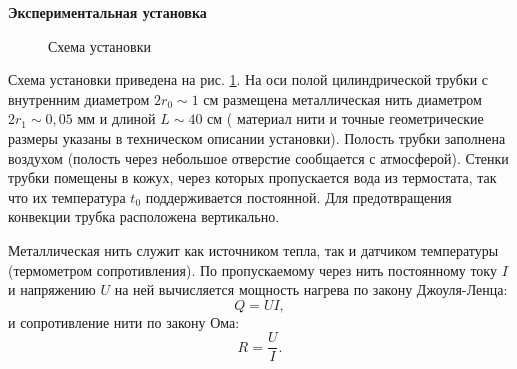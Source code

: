 \documentclass[a4paper, 12pt]{article}
\begin{document}
    \begin{center}
        {\Large {\bf Экспериментальная установка}}
    \end{center}
    
    \begin{figure}
        \caption{Схема установки}
        \label{pic2}
    \end{figure}
    Схема установки приведена на рис. \ref{pic2}. На оси полой цилиндрической трубки с внутренним диаметром $ 2r_{0} \sim 1 \text{ см} $ размещена металлическая нить диаметром $ 2r_{1} \sim 0,05 \text{ мм} $ и длиной $ L \sim 40 \text{ см} $ ( материал нити и точные геометрические размеры указаны в техническом описании установки). Полость трубки заполнена воздухом (полость через небольшое отверстие сообщается с атмосферой). Стенки трубки помещены в кожух, через которых пропускается вода из термостата, так что их температура $ t_{0} $ поддерживается постоянной. Для предотвращения конвекции трубка расположена вертикально.
    
    Металлическая нить служит как источником тепла, так и датчиком температуры (термометром сопротивления). По пропускаемому через нить постоянному току $ I $ и напряжению $ U $ на ней вычисляется мощность нагрева по закону Джоуля-Ленца:
    \begin{equation}
        Q = UI,
    \end{equation}
    и сопротивление нити по закону Ома:
    \begin{equation}
        R = \frac{U}{I}.
    \end{equation}
    
\end{document}
